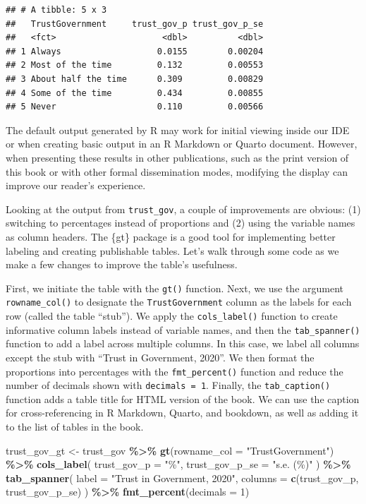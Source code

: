 \documentclass[
]{krantz}
\makeatletter
\newenvironment{Shaded}{\begin{snugshade}}{\end{snugshade}}
\newcommand{\AttributeTok}[1]{\textcolor[rgb]{0.27,0.27,0.27}{#1}}
\newcommand{\DecValTok}[1]{\textcolor[rgb]{0.06,0.06,0.06}{#1}}
\newcommand{\FunctionTok}[1]{\textcolor[rgb]{0.27,0.27,0.27}{\textbf{#1}}}
\newcommand{\NormalTok}[1]{#1}
\newcommand{\OtherTok}[1]{\textcolor[rgb]{0.37,0.37,0.37}{#1}}
\newcommand{\SpecialCharTok}[1]{\textcolor[rgb]{0.43,0.43,0.43}{\textbf{#1}}}
\newcommand{\StringTok}[1]{\textcolor[rgb]{0.5,0.5,0.5}{#1}}
\newenvironment{kframe}{%
\medskip{}
\setlength{\fboxsep}{.8em}
 \def\at@end@of@kframe{}%
 \ifinner\ifhmode%
  \def\at@end@of@kframe{\end{minipage}}%
  \begin{minipage}{\columnwidth}%
 \fi\fi%
 \def\FrameCommand##1{\hskip\@totalleftmargin \hskip-\fboxsep
 \colorbox{shadecolor}{##1}\hskip-\fboxsep
     \hskip-\linewidth \hskip-\@totalleftmargin \hskip\columnwidth}%
 \MakeFramed {\advance\hsize-\width
   \@totalleftmargin\z@ \linewidth\hsize
   \@setminipage}}%
 {\par\unskip\endMakeFramed%
 \at@end@of@kframe}
\renewenvironment{Shaded}{\begin{kframe}}{\end{kframe}}
\makeatother
\begin{document}
\begin{verbatim}
## # A tibble: 5 x 3
##   TrustGovernment     trust_gov_p trust_gov_p_se
##   <fct>                     <dbl>          <dbl>
## 1 Always                   0.0155        0.00204
## 2 Most of the time         0.132         0.00553
## 3 About half the time      0.309         0.00829
## 4 Some of the time         0.434         0.00855
## 5 Never                    0.110         0.00566
\end{verbatim}

The default output generated by R may work for initial viewing inside our IDE or when creating basic output in an R Markdown or Quarto document. However, when presenting these results in other publications, such as the print version of this book or with other formal dissemination modes, modifying the display can improve our reader's experience.

Looking at the output from \texttt{trust\_gov}, a couple of improvements are obvious: (1) switching to percentages instead of proportions and (2) using the variable names as column headers. The \{gt\} package is a good tool for implementing better labeling and creating publishable tables. Let's walk through some code as we make a few changes to improve the table's usefulness.

First, we initiate the table with the \texttt{gt()} function. Next, we use the argument \texttt{rowname\_col()} to designate the \texttt{TrustGovernment} column as the labels for each row (called the table ``stub''). We apply the \texttt{cols\_label()} function to create informative column labels instead of variable names, and then the \texttt{tab\_spanner()} function to add a label across multiple columns. In this case, we label all columns except the stub with ``Trust in Government, 2020''. We then format the proportions into percentages with the \texttt{fmt\_percent()} function and reduce the number of decimals shown with \texttt{decimals\ =\ 1}. Finally, the \texttt{tab\_caption()} function adds a table title for HTML version of the book. We can use the caption for cross-referencing in R Markdown, Quarto, and bookdown, as well as adding it to the list of tables in the book.

\begin{Shaded}
\begin{Highlighting}[]
\NormalTok{trust\_gov\_gt }\OtherTok{\textless{}{-}}\NormalTok{ trust\_gov }\SpecialCharTok{\%\textgreater{}\%}
  \FunctionTok{gt}\NormalTok{(}\AttributeTok{rowname\_col =} \StringTok{"TrustGovernment"}\NormalTok{) }\SpecialCharTok{\%\textgreater{}\%}
  \FunctionTok{cols\_label}\NormalTok{(}
    \AttributeTok{trust\_gov\_p =} \StringTok{"\%"}\NormalTok{,}
    \AttributeTok{trust\_gov\_p\_se =} \StringTok{"s.e. (\%)"}
\NormalTok{  ) }\SpecialCharTok{\%\textgreater{}\%}
  \FunctionTok{tab\_spanner}\NormalTok{(}
    \AttributeTok{label =} \StringTok{"Trust in Government, 2020"}\NormalTok{,}
    \AttributeTok{columns =} \FunctionTok{c}\NormalTok{(trust\_gov\_p, trust\_gov\_p\_se)}
\NormalTok{  ) }\SpecialCharTok{\%\textgreater{}\%}
  \FunctionTok{fmt\_percent}\NormalTok{(}\AttributeTok{decimals =} \DecValTok{1}\NormalTok{)}
\end{Highlighting}
\end{Shaded}
\end{document}
